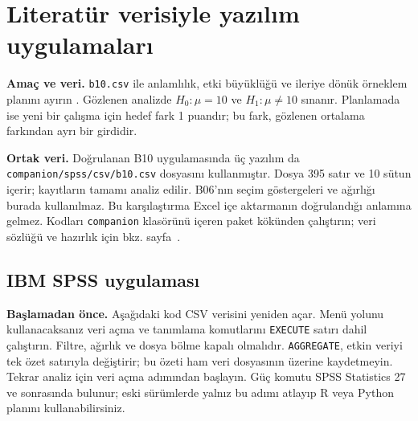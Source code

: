 \section{Literatür verisiyle yazılım uygulamaları}
\label{sec:spss-b10}

\textbf{Amaç ve veri.} \texttt{b10.csv} ile anlamlılık, etki büyüklüğü
ve ileriye dönük örneklem planını ayırın \citep{cortez2008data}.
Gözlenen analizde $H_0:\mu=10$ ve $H_1:\mu\ne10$ sınanır.
Planlamada ise yeni bir çalışma için hedef fark 1 puandır;
bu fark, gözlenen ortalama farkından ayrı bir girdidir.

\textbf{Ortak veri.} Doğrulanan B10 uygulamasında üç yazılım da
\nolinkurl{companion/spss/csv/b10.csv} dosyasını kullanmıştır.
Dosya 395 satır ve 10 sütun içerir; kayıtların tamamı analiz edilir.
B06'nın seçim göstergeleri ve ağırlığı burada kullanılmaz.
Bu karşılaştırma Excel içe aktarmanın doğrulandığı anlamına gelmez.
Kodları \texttt{companion} klasörünü içeren paket kökünden çalıştırın;
veri sözlüğü ve hazırlık için bkz. sayfa~\pageref{sec:spss-guide}.

\subsection{IBM SPSS uygulaması}
\textbf{Başlamadan önce.} Aşağıdaki kod CSV verisini yeniden açar.
Menü yolunu kullanacaksanız veri açma ve tanımlama komutlarını
\texttt{EXECUTE} satırı dahil çalıştırın. Filtre, ağırlık ve dosya
bölme kapalı olmalıdır. \texttt{AGGREGATE}, etkin veriyi tek özet
satırıyla değiştirir; bu özeti ham veri dosyasının üzerine kaydetmeyin.
Tekrar analiz için veri açma adımından başlayın. Güç komutu SPSS
Statistics 27 ve sonrasında bulunur; eski sürümlerde yalnız bu adımı
atlayıp R veya Python planını kullanabilirsiniz.

\begin{spssadimlar}
\end{spssadimlar}

